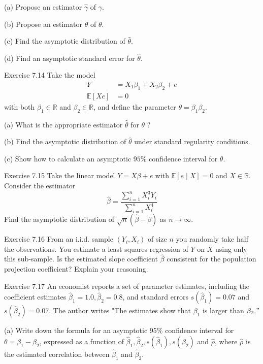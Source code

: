 \documentclass[10pt]{article}
\begin{document}
(a) Propose an estimator $\widehat{\gamma}$ of $\gamma$.

(b) Propose an estimator $\widehat{\theta}$ of $\theta$.

(c) Find the asymptotic distribution of $\widehat{\theta}$.

(d) Find an asymptotic standard error for $\widehat{\theta}$.

Exercise 7.14 Take the model
$$
\begin{aligned}
Y &=X_{1} \beta_{1}+X_{2} \beta_{2}+e \\
\mathbb{E}[X e] &=0
\end{aligned}
$$
with both $\beta_{1} \in \mathbb{R}$ and $\beta_{2} \in \mathbb{R}$, and define the parameter $\theta=\beta_{1} \beta_{2}$.

(a) What is the appropriate estimator $\widehat{\theta}$ for $\theta$ ?

(b) Find the asymptotic distribution of $\widehat{\theta}$ under standard regularity conditions.

(c) Show how to calculate an asymptotic $95 \%$ confidence interval for $\theta$.

Exercise 7.15 Take the linear model $Y=X \beta+e$ with $\mathbb{E}[e \mid X]=0$ and $X \in \mathbb{R}$. Consider the estimator
$$
\widehat{\beta}=\frac{\sum_{i=1}^{n} X_{i}^{3} Y_{i}}{\sum_{i=1}^{n} X_{i}^{4}}
$$
Find the asymptotic distribution of $\sqrt{n}(\widehat{\beta}-\beta)$ as $n \rightarrow \infty$.

Exercise 7.16 From an i.i.d. sample $\left(Y_{i}, X_{i}\right)$ of size $n$ you randomly take half the observations. You estimate a least squares regression of $Y$ on $X$ using only this sub-sample. Is the estimated slope coefficient $\widehat{\beta}$ consistent for the population projection coefficient? Explain your reasoning.

Exercise 7.17 An economist reports a set of parameter estimates, including the coefficient estimates $\widehat{\beta}_{1}=1.0, \widehat{\beta}_{2}=0.8$, and standard errors $s\left(\widehat{\beta}_{1}\right)=0.07$ and $s\left(\widehat{\beta}_{2}\right)=0.07$. The author writes "The estimates show that $\beta_{1}$ is larger than $\beta_{2} . "$

(a) Write down the formula for an asymptotic 95\% confidence interval for $\theta=\beta_{1}-\beta_{2}$, expressed as a function of $\widehat{\beta}_{1}, \widehat{\beta}_{2}, s\left(\widehat{\beta}_{1}\right), s\left(\widehat{\beta}_{2}\right)$ and $\widehat{\rho}$, where $\widehat{\rho}$ is the estimated correlation between $\widehat{\beta}_{1}$ and $\widehat{\beta}_{2}$.
\end{document}
